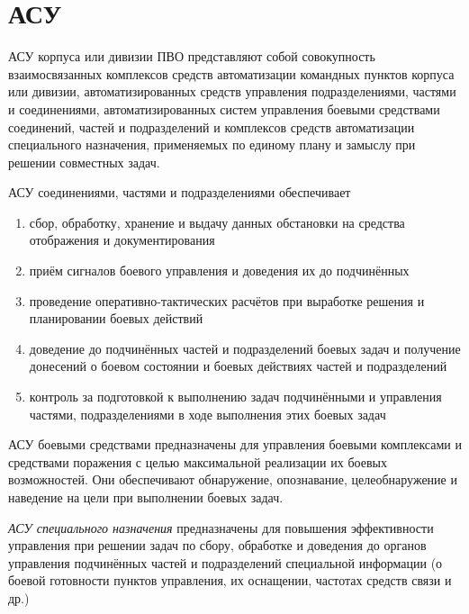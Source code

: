 \documentclass[a4paper,12pt]{article}
\begin{document}
	\section{\bf АСУ}
	АСУ корпуса или дивизии ПВО представляют собой совокупность взаимосвязанных комплексов
средств автоматизации командных пунктов корпуса или дивизии, автоматизированных средств
управления подразделениями, частями и соединениями, автоматизированных систем управления
боевыми средствами соединений, частей и подразделений и комплексов средств автоматизации
специального назначения, применяемых по единому плану и замыслу при решении совместных задач.

	АСУ соединениями, частями и подразделениями обеспечивает 
	\begin{enumerate}
		\item сбор, обработку, хранение и выдачу данных обстановки на средства отображения и 
		документирования
		\item приём сигналов боевого управления и доведения их до подчинённых
		\item проведение оперативно-тактических расчётов при выработке решения и планировании 
		боевых действий
		\item доведение до подчинённых частей и подразделений боевых задач и получение 
		донесений о боевом состоянии и боевых действиях частей и подразделений
		\item контроль за подготовкой к выполнению задач подчинёнными и управления частями, 
		подразделениями в ходе выполнения этих боевых задач
	\end{enumerate}
	
	АСУ боевыми средствами предназначены для управления боевыми комплексами и средствами 
поражения с целью максимальной реализации их боевых возможностей. Они обеспечивают обнаружение, 
опознавание, целеобнаружение и наведение на цели при выполнении боевых задач.
	
	{\em АСУ специального назначения} предназначены для повышения эффективности управления при 
решении задач по сбору, обработке и доведения до органов управления подчинённых частей и 
подразделений специальной информации (о боевой готовности пунктов управления, их оснащении, 
частотах средств связи и др.)
\end{document}
